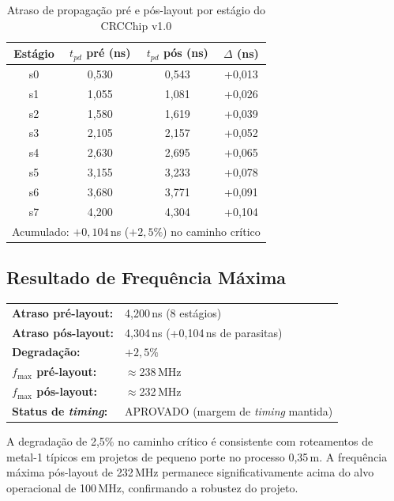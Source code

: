 \documentclass[12pt,a4paper]{article}
\begin{document}
\begin{table}[h!]
\centering
\caption{Atraso de propagação pré e pós-layout por estágio do CRCChip v1.0}
\label{tab:poslayout}
\begin{tabular}{cccc}
\toprule
\textbf{Estágio} & \textbf{$t_{pd}$ pré (ns)} & \textbf{$t_{pd}$ pós (ns)} & \textbf{$\Delta$ (ns)} \\
\midrule
s0 & 0,530 & 0,543 & +0,013 \\
s1 & 1,055 & 1,081 & +0,026 \\
s2 & 1,580 & 1,619 & +0,039 \\
s3 & 2,105 & 2,157 & +0,052 \\
s4 & 2,630 & 2,695 & +0,065 \\
s5 & 3,155 & 3,233 & +0,078 \\
s6 & 3,680 & 3,771 & +0,091 \\
s7 & 4,200 & 4,304 & +0,104 \\
\bottomrule
\multicolumn{4}{r}{\small Acumulado: $+0{,}104$\,ns ($+2{,}5\%$) no caminho crítico}
\end{tabular}
\end{table}

\subsection{Resultado de Frequência Máxima}

\begin{resultbox}
\begin{tabular}{ll}
\textbf{Atraso pré-layout:}      & 4,200\,ns (8 estágios) \\
\textbf{Atraso pós-layout:}      & 4,304\,ns (+0,104\,ns de parasitas) \\
\textbf{Degradação:}             & $+2{,}5\%$ \\
\textbf{$f_{\max}$ pré-layout:}  & $\approx$238\,MHz \\
\textbf{$f_{\max}$ pós-layout:}  & $\approx$232\,MHz \\
\textbf{Status de \textit{timing}:} & APROVADO (margem de \textit{timing} mantida) \\
\end{tabular}
\end{resultbox}

A degradação de 2,5\% no caminho crítico é consistente com roteamentos de metal-1 típicos em projetos de pequeno porte no processo 0,35\,\textmu m. A frequência máxima pós-layout de 232\,MHz permanece significativamente acima do alvo operacional de 100\,MHz, confirmando a robustez do projeto.
\end{document}
